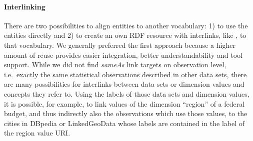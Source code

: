 \documentclass[sw]{iosart2x}
\begin{document}
\paragraph{Interlinking}
There are two possibilities to align entities to another vocabulary: 1) to use the entities directly and 2) to create an own RDF resource with interlinks, like , to that vocabulary.
We generally preferred the first approach because a higher amount of reuse provides easier integration, better understandability and tool support.
While we did not find \emph{sameAs} link targets on observation level, i.e.~exactly the same statistical observations described in other data sets, there are many possibilities for interlinks between data sets or dimension values and concepts they refer to.
Using the labels of those data sets and dimension values, it is possible, for example, to link values of the dimension \enquote{region} of a federal budget, and thus indirectly also the observations which use those values, to the cities in DBpedia or LinkedGeoData whose labels are contained in the label of the region value URI.

\end{document}
